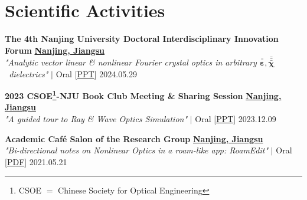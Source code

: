 
\section{Scientific Activities}
\begin{etaremune}[label={[\reversearabic*]},leftmargin=0.041\textwidth,itemsep=0pt]
	{\item \textbf{The 4th Nanjing University Doctoral Interdisciplinary Innovation Forum} \hfill \href{https://www.google.com/maps/place/\%E4\%B8\%AD\%E5\%9B\%BD\%E6\%B1\%9F\%E8\%8B\%8F\%E7\%9C\%81\%E5\%8D\%97\%E4\%BA\%AC\%E5\%B8\%82}{\textbf{Nanjing, Jiangsu}} \\ \textit{ "Analytic vector linear \& nonlinear Fourier crystal optics in arbitrary $\bar{\bar{\boldsymbol \varepsilon}}, \bar{\bar{\bar{\boldsymbol \chi}}}$ dielectrics"} $|$ {\color{color-detail} Oral} [\href{https://www.google.com/maps/place/\%E4\%B8\%AD\%E5\%9B\%BD\%E6\%B1\%9F\%E8\%8B\%8F\%E7\%9C\%81\%E5\%8D\%97\%E4\%BA\%AC\%E5\%B8\%82}{\small PPT}] \hfill 2024.05.29}
	{\item \textbf{2023 CSOE\footnote{CSOE $=$ Chinese Society for Optical Engineering}-NJU Book Club Meeting \& Sharing Session} \hfill \href{https://www.google.com/maps/place/\%E4\%B8\%AD\%E5\%9B\%BD\%E6\%B1\%9F\%E8\%8B\%8F\%E7\%9C\%81\%E5\%8D\%97\%E4\%BA\%AC\%E5\%B8\%82}{\textbf{Nanjing, Jiangsu}} \\ \textit{ "A guided tour to Ray \& Wave Optics Simulation"} $|$ {\color{color-detail} Oral} [\href{https://github.com/ChenZhu-Xie/PhD_academia/blob/master/2__Side_Projects/7.1__A_guided_tour_to_Ray_\%26_Wave_Optics_Simulation_\%E2\%86\%90_JavaScript\%2BPython__3.5_year_-_2023.12.9.pdf}{\small PPT}] \hfill 2023.12.09}
	{\item \textbf{Academic Café Salon of the Research Group} \hfill \href{https://www.google.com/maps/place/\%E4\%B8\%AD\%E5\%9B\%BD\%E6\%B1\%9F\%E8\%8B\%8F\%E7\%9C\%81\%E5\%8D\%97\%E4\%BA\%AC\%E5\%B8\%82}{\textbf{Nanjing, Jiangsu}} \\ \textit{ "Bi-directional notes on Nonlinear Optics in a roam-like app: RoamEdit"} $|$ {\color{color-detail} Oral} [\href{https://github.com/ChenZhu-Xie/postgraduate_academia/blob/main/2__Side_Projects/2.1__Reading_Club\%EF\%BC\%9ANotes_with_Bi-directional_Links_in_RoamEdit__1.0_year_-_2021.5.21.pdf}{\small PDF}] \hfill 2021.05.21}
\end{etaremune}

%	
%
%
